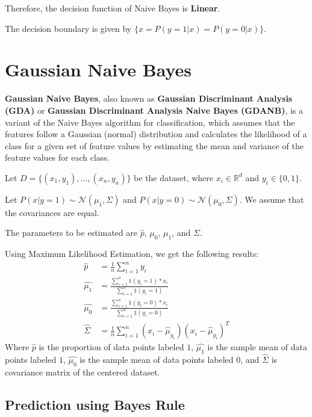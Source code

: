 \documentclass[
]{article}
\begin{document}
Therefore, the decision function of Naive Bayes is \textbf{Linear}.

The decision boundary is given by \(\{x=P(y=1|x)=P(y=0|x)\}\).

\hypertarget{gaussian-naive-bayes}{%
\section{Gaussian Naive Bayes}\label{gaussian-naive-bayes}}
\textbf{Gaussian Naive Bayes}, also known as \textbf{Gaussian Discriminant Analysis (GDA)} or \textbf{Gaussian Discriminant Analysis Naive Bayes (GDANB)}, is a variant of the Naive Bayes algorithm for classification, which assumes that the features follow a Gaussian (normal) distribution and calculates the likelihood of a class for a given set of feature values by estimating the mean and variance of the feature values for each class.

Let \(D=\{(x_1, y_1), \ldots, (x_n,y_n)\}\) be the dataset, where
\(x_i \in \mathbb{R}^d\) and \(y_i \in \{0, 1\}\).

Let \(P(x|y=1)\sim\mathcal{N}(\mu_1,\Sigma)\) and
\(P(x|y=0)\sim\mathcal{N}(\mu_0,\Sigma)\). We assume that the
covariances are equal.

The parameters to be estimated are \(\hat{p}\), \(\mu_0\), \(\mu_1\),
and \(\Sigma\).

Using Maximum Likelihood Estimation, we get the following results:
\begin{align*} 
\hat{p}&=\frac{1}{n}\sum_{i=1}^ny_i \\
\hat{\mu_1} &= \frac{\displaystyle \sum_{i=1}^n\mathbb{1}(y_i=1)*x_i}{\displaystyle \sum_{i=1}^n\mathbb{1}(y_i=1)} \\
\hat{\mu_0} &= \frac{\displaystyle \sum_{i=1}^n\mathbb{1}(y_i=0)*x_i}{\displaystyle \sum_{i=1}^n\mathbb{1}(y_i=0)} \\
\hat{\Sigma} &= \frac{1}{n} \displaystyle \sum_{i=1}^n(x_i-\hat{\mu}_{y_i})(x_i-\hat{\mu}_{y_i})^T
\end{align*} Where \(\hat{p}\) is the proportion of data points labeled
\(1\), \(\hat{\mu_1}\) is the sample mean of data points labeled \(1\),
\(\hat{\mu_0}\) is the sample mean of data points labeled \(0\), and
\(\hat{\Sigma}\) is covariance matrix of the centered dataset.

\hypertarget{prediction-using-bayes-rule}{%
\subsection{Prediction using Bayes
Rule}\label{prediction-using-bayes-rule}}
\end{document}
